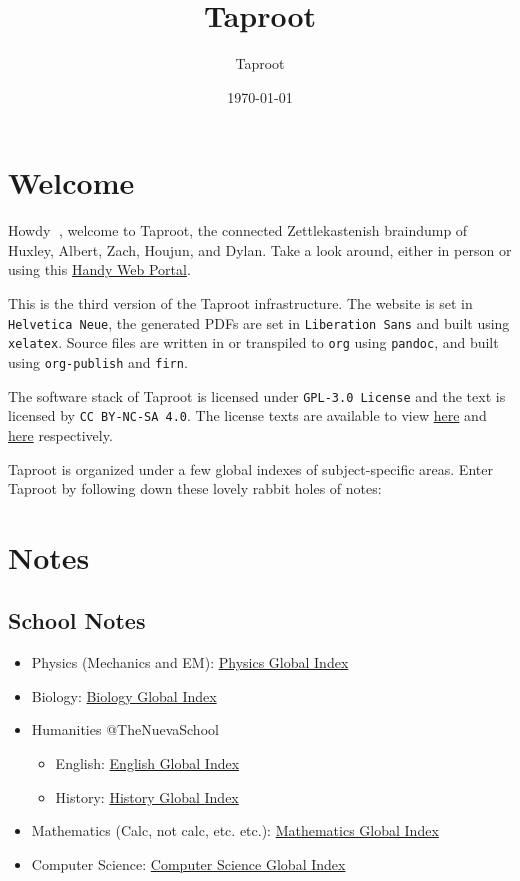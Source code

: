 \documentclass[letterpaper]{article}
\author{Taproot}
\date{\today}
\title{Taproot}
\renewcommand\maketitle{}
\begin{document}
\maketitle

\section{Welcome}
\label{sec:org87d4c67}
Howdy 👋, welcome to Taproot, the connected Zettlekastenish braindump of Huxley, Albert, Zach, Houjun, and Dylan. Take a look around, either in person or using this \href{https://taproot3.sanity.gq}{Handy Web Portal}.

This is the third version of the Taproot infrastructure. The website is set in \texttt{Helvetica Neue}, the generated PDFs are set in \texttt{Liberation Sans} and built using \texttt{xelatex}. Source files are written in or transpiled to \texttt{org} using \texttt{pandoc}, and built using \texttt{org-publish} and \texttt{firn}.

The software stack of Taproot is licensed under \texttt{GPL-3.0 License} and the text is licensed by \texttt{CC BY-NC-SA 4.0}. The license texts are available to view \href{https://www.gnu.org/licenses/gpl-3.0.en.html}{here} and \href{https://creativecommons.org/licenses/by-nc-sa/2.0/}{here} respectively.

Taproot is organized under a few global indexes of subject-specific areas. Enter Taproot by following down these lovely rabbit holes of notes:

\section{Notes}
\label{sec:orgce34042}

\subsection{School Notes}
\label{sec:orgff9b68c}
\begin{itemize}
\item Physics (Mechanics and EM): \href{physics/index.org}{Physics Global Index}
\item Biology: \href{biology/index.org}{Biology Global Index}
\item Humanities @TheNuevaSchool
\begin{itemize}
\item English: \href{english/index.org}{English Global Index}
\item History: \href{history/index.org}{History Global Index}
\end{itemize}
\item Mathematics (Calc, not calc, etc. etc.): \href{mathematics/index.org}{Mathematics Global Index}
\item Computer Science: \href{cs/index.org}{Computer Science Global Index}
\end{itemize}
\end{document}
